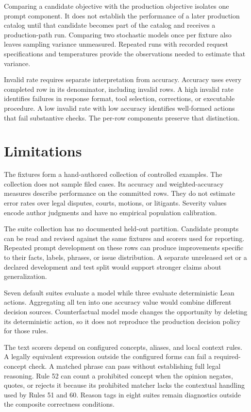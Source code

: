\documentclass[11pt]{article}
\begin{document}
Comparing a candidate objective with the production objective isolates one prompt component.  It does not establish the performance of a later production catalog until that candidate becomes part of the catalog and receives a production-path run.  Comparing two stochastic models once per fixture also leaves sampling variance unmeasured.  Repeated runs with recorded request specifications and temperatures provide the observations needed to estimate that variance.

Invalid rate requires separate interpretation from accuracy.  Accuracy uses every completed row in its denominator, including invalid rows.  A high invalid rate identifies failures in response format, tool selection, corrections, or executable procedure.  A low invalid rate with low accuracy identifies well-formed actions that fail substantive checks.  The per-row components preserve that distinction.

\section{Limitations}

The fixtures form a hand-authored collection of controlled examples.  The collection does not sample filed cases.  Its accuracy and weighted-accuracy measures describe performance on the committed rows.  They do not estimate error rates over legal disputes, courts, motions, or litigants.  Severity values encode author judgments and have no empirical population calibration.

The suite collection has no documented held-out partition.  Candidate prompts can be read and revised against the same fixtures and scorers used for reporting.  Repeated prompt development on these rows can produce improvements specific to their facts, labels, phrases, or issue distribution.  A separate unreleased set or a declared development and test split would support stronger claims about generalization.

Seven default suites evaluate a model while three evaluate deterministic Lean actions.  Aggregating all ten into one accuracy value would combine different decision sources.  Counterfactual model mode changes the opportunity by deleting its deterministic action, so it does not reproduce the production decision policy for those rules.

The text scorers depend on configured concepts, aliases, and local context rules.  A legally equivalent expression outside the configured forms can fail a required-concept check.  A matched phrase can pass without establishing full legal reasoning.  Rule 52 can count a prohibited concept when the opinion negates, quotes, or rejects it because its prohibited matcher lacks the contextual handling used by Rules 51 and 60.  Reason tags in eight suites remain diagnostics outside the composite correctness conditions.
\end{document}
